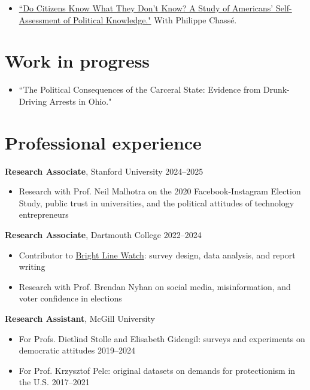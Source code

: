 \documentclass[margin, 10pt]{res}
\begin{document}
\begin{resume}
\begin{itemize}
	\item \href{https://obbergeron.github.io/work_in_progress/knowledge_assessments_ms_csdc.pdf}{``Do Citizens Know What They Don't Know? A Study of Americans' Self-Assessment of Political Knowledge."} With Philippe Chassé.

\end{itemize}

\section{Work in progress}
\begin{itemize}

	\item ``The Political Consequences of the Carceral State: Evidence from Drunk-Driving Arrests in Ohio."

\end{itemize}

\section{Professional experience}

\textbf{Research Associate}, Stanford University \hspace*{0pt}\hfill 2024--2025
\begin{itemize}
	\item Research with Prof. Neil Malhotra on the 2020 Facebook-Instagram Election Study, public trust in universities, and the political attitudes of technology entrepreneurs
\end{itemize}

\textbf{Research Associate}, Dartmouth College \hspace*{0pt}\hfill 2022--2024
\begin{itemize}
	\item Contributor to \href{http://brightlinewatch.org/}{Bright Line Watch}: survey design, data analysis, and report writing
	\item Research with Prof. Brendan Nyhan on social media, misinformation, and voter confidence in elections
\end{itemize}

\textbf{Research Assistant}, McGill University
\begin{itemize}
	\item For Profs. Dietlind Stolle and Elisabeth Gidengil: surveys and experiments on democratic attitudes \hspace*{0pt}\hfill 2019--2024
	\item For Prof. Krzysztof Pelc: original datasets on demands for protectionism in the U.S. \hspace*{0pt}\hfill 2017--2021
\end{itemize}


\end{resume}
\end{document}
